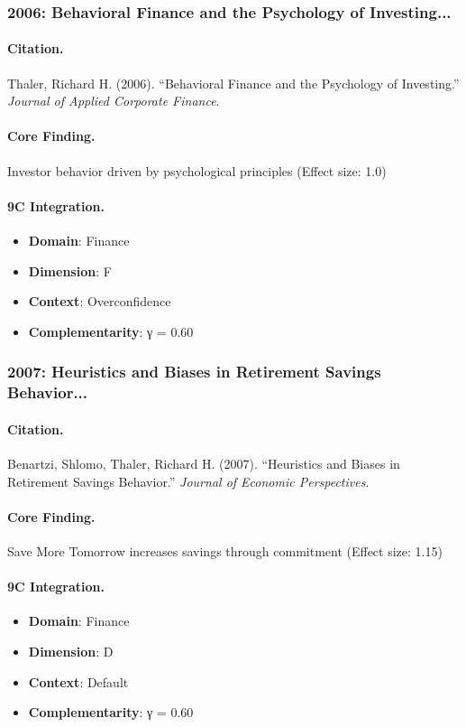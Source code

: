 \subsubsection{2006: Behavioral Finance and the Psychology of Investing...}

\paragraph{Citation.}
Thaler, Richard H. (2006). ``Behavioral Finance and the Psychology of Investing.''
\textit{Journal of Applied Corporate Finance}.

\paragraph{Core Finding.}
Investor behavior driven by psychological principles (Effect size: 1.0)

\paragraph{9C Integration.}
\begin{itemize}[nosep]
  \item \textbf{Domain}: Finance
  \item \textbf{Dimension}: F
  \item \textbf{Context}: Overconfidence
  \item \textbf{Complementarity}: γ = 0.60
\end{itemize}

\subsubsection{2007: Heuristics and Biases in Retirement Savings Behavior...}

\paragraph{Citation.}
Benartzi, Shlomo, Thaler, Richard H. (2007). ``Heuristics and Biases in Retirement Savings Behavior.''
\textit{Journal of Economic Perspectives}.

\paragraph{Core Finding.}
Save More Tomorrow increases savings through commitment (Effect size: 1.15)

\paragraph{9C Integration.}
\begin{itemize}[nosep]
  \item \textbf{Domain}: Finance
  \item \textbf{Dimension}: D
  \item \textbf{Context}: Default
  \item \textbf{Complementarity}: γ = 0.60
\end{itemize}

